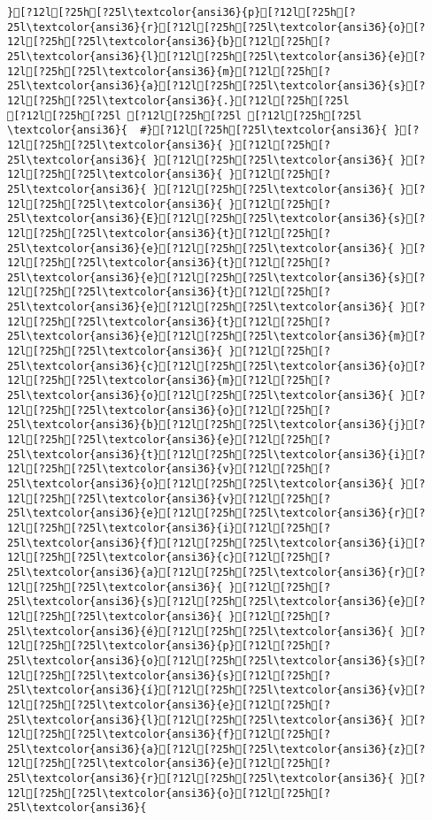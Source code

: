 \documentclass{scrartcl}
\begin{document}
\begin{Verbatim}
}[?12l[?25h[?25l\textcolor{ansi36}{p}[?12l[?25h[?25l\textcolor{ansi36}{r}[?12l[?25h[?25l\textcolor{ansi36}{o}[?12l[?25h[?25l\textcolor{ansi36}{b}[?12l[?25h[?25l\textcolor{ansi36}{l}[?12l[?25h[?25l\textcolor{ansi36}{e}[?12l[?25h[?25l\textcolor{ansi36}{m}[?12l[?25h[?25l\textcolor{ansi36}{a}[?12l[?25h[?25l\textcolor{ansi36}{s}[?12l[?25h[?25l\textcolor{ansi36}{.}[?12l[?25h[?25l
[?12l[?25h[?25l [?12l[?25h[?25l [?12l[?25h[?25l
\textcolor{ansi36}{  #}[?12l[?25h[?25l\textcolor{ansi36}{ }[?12l[?25h[?25l\textcolor{ansi36}{ }[?12l[?25h[?25l\textcolor{ansi36}{ }[?12l[?25h[?25l\textcolor{ansi36}{ }[?12l[?25h[?25l\textcolor{ansi36}{ }[?12l[?25h[?25l\textcolor{ansi36}{ }[?12l[?25h[?25l\textcolor{ansi36}{ }[?12l[?25h[?25l\textcolor{ansi36}{ }[?12l[?25h[?25l\textcolor{ansi36}{E}[?12l[?25h[?25l\textcolor{ansi36}{s}[?12l[?25h[?25l\textcolor{ansi36}{t}[?12l[?25h[?25l\textcolor{ansi36}{e}[?12l[?25h[?25l\textcolor{ansi36}{ }[?12l[?25h[?25l\textcolor{ansi36}{t}[?12l[?25h[?25l\textcolor{ansi36}{e}[?12l[?25h[?25l\textcolor{ansi36}{s}[?12l[?25h[?25l\textcolor{ansi36}{t}[?12l[?25h[?25l\textcolor{ansi36}{e}[?12l[?25h[?25l\textcolor{ansi36}{ }[?12l[?25h[?25l\textcolor{ansi36}{t}[?12l[?25h[?25l\textcolor{ansi36}{e}[?12l[?25h[?25l\textcolor{ansi36}{m}[?12l[?25h[?25l\textcolor{ansi36}{ }[?12l[?25h[?25l\textcolor{ansi36}{c}[?12l[?25h[?25l\textcolor{ansi36}{o}[?12l[?25h[?25l\textcolor{ansi36}{m}[?12l[?25h[?25l\textcolor{ansi36}{o}[?12l[?25h[?25l\textcolor{ansi36}{ }[?12l[?25h[?25l\textcolor{ansi36}{o}[?12l[?25h[?25l\textcolor{ansi36}{b}[?12l[?25h[?25l\textcolor{ansi36}{j}[?12l[?25h[?25l\textcolor{ansi36}{e}[?12l[?25h[?25l\textcolor{ansi36}{t}[?12l[?25h[?25l\textcolor{ansi36}{i}[?12l[?25h[?25l\textcolor{ansi36}{v}[?12l[?25h[?25l\textcolor{ansi36}{o}[?12l[?25h[?25l\textcolor{ansi36}{ }[?12l[?25h[?25l\textcolor{ansi36}{v}[?12l[?25h[?25l\textcolor{ansi36}{e}[?12l[?25h[?25l\textcolor{ansi36}{r}[?12l[?25h[?25l\textcolor{ansi36}{i}[?12l[?25h[?25l\textcolor{ansi36}{f}[?12l[?25h[?25l\textcolor{ansi36}{i}[?12l[?25h[?25l\textcolor{ansi36}{c}[?12l[?25h[?25l\textcolor{ansi36}{a}[?12l[?25h[?25l\textcolor{ansi36}{r}[?12l[?25h[?25l\textcolor{ansi36}{ }[?12l[?25h[?25l\textcolor{ansi36}{s}[?12l[?25h[?25l\textcolor{ansi36}{e}[?12l[?25h[?25l\textcolor{ansi36}{ }[?12l[?25h[?25l\textcolor{ansi36}{é}[?12l[?25h[?25l\textcolor{ansi36}{ }[?12l[?25h[?25l\textcolor{ansi36}{p}[?12l[?25h[?25l\textcolor{ansi36}{o}[?12l[?25h[?25l\textcolor{ansi36}{s}[?12l[?25h[?25l\textcolor{ansi36}{s}[?12l[?25h[?25l\textcolor{ansi36}{í}[?12l[?25h[?25l\textcolor{ansi36}{v}[?12l[?25h[?25l\textcolor{ansi36}{e}[?12l[?25h[?25l\textcolor{ansi36}{l}[?12l[?25h[?25l\textcolor{ansi36}{ }[?12l[?25h[?25l\textcolor{ansi36}{f}[?12l[?25h[?25l\textcolor{ansi36}{a}[?12l[?25h[?25l\textcolor{ansi36}{z}[?12l[?25h[?25l\textcolor{ansi36}{e}[?12l[?25h[?25l\textcolor{ansi36}{r}[?12l[?25h[?25l\textcolor{ansi36}{ }[?12l[?25h[?25l\textcolor{ansi36}{o}[?12l[?25h[?25l\textcolor{ansi36}{ 
\end{Verbatim}
\end{document}
